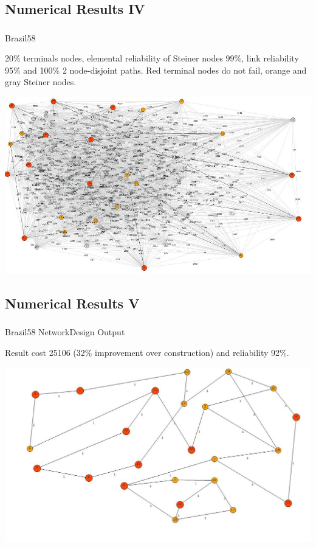 \subsection{Numerical Results IV}
\begin{frame}\frametitle{}
\begin{block}{Brazil58}
\begin{scriptsize}
20\% terminals nodes, elemental reliability of Steiner nodes 99\%, link reliability 95\% and 100\% 2 node-disjoint paths. Red terminal nodes do not fail, orange and gray Steiner nodes.
\end{scriptsize}
\begin{center}
   \includegraphics[scale=0.35]{figuras/1}
\end{center}
\end{block}
\end{frame}

\subsection{Numerical Results V}
\begin{frame}\frametitle{}
\begin{block}{Brazil58 NetworkDesign Output}
\begin{scriptsize}
Result cost 25106 (32\% improvement over construction) and reliability 92\%. 
\end{scriptsize}
\begin{center}
   \includegraphics[scale=0.35]{figuras/2}
\end{center}
\end{block}
\end{frame}

